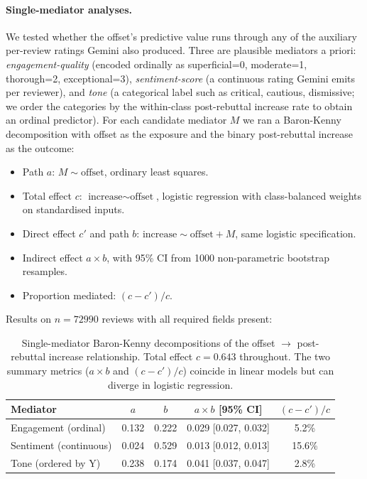 \documentclass{article}
\begin{document}
\paragraph{Single-mediator analyses.}
We tested whether the offset's predictive value runs through any of the auxiliary per-review ratings Gemini also produced. Three are plausible mediators a priori: \emph{engagement-quality} (encoded ordinally as superficial=0, moderate=1, thorough=2, exceptional=3), \emph{sentiment-score} (a continuous rating Gemini emits per reviewer), and \emph{tone} (a categorical label such as critical, cautious, dismissive; we order the categories by the within-class post-rebuttal increase rate to obtain an ordinal predictor). For each candidate mediator $M$ we ran a Baron-Kenny decomposition with offset as the exposure and the binary post-rebuttal increase as the outcome:

\begin{itemize}
    \item Path $a$: $M \sim \text{offset}$, ordinary least squares.
    \item Total effect $c$: $\text{increase} \sim \text{offset}$, logistic regression with class-balanced weights on standardised inputs.
    \item Direct effect $c'$ and path $b$: $\text{increase} \sim \text{offset} + M$, same logistic specification.
    \item Indirect effect $a \times b$, with 95\% CI from \num{1000} non-parametric bootstrap resamples.
    \item Proportion mediated: $(c - c') / c$.
\end{itemize}

Results on $n = \num{72990}$ reviews with all required fields present:

\begin{table}[htbp]
    \centering
    \caption{Single-mediator Baron-Kenny decompositions of the offset $\to$ post-rebuttal increase relationship. Total effect $c = 0.643$ throughout. The two summary metrics ($a \times b$ and $(c - c')/c$) coincide in linear models but can diverge in logistic regression.}
    \label{tab:mediation}
    \begin{tabular}{lcccc}
    \toprule
    Mediator & $a$ & $b$ & $a \times b$ [95\% CI] & $(c - c')/c$ \\
    \midrule
    Engagement (ordinal)  & 0.132 & 0.222 & 0.029 [0.027, 0.032] & 5.2\% \\
    Sentiment (continuous) & 0.024 & 0.529 & 0.013 [0.012, 0.013] & 15.6\% \\
    Tone (ordered by Y)    & 0.238 & 0.174 & 0.041 [0.037, 0.047] & 2.8\% \\
    \bottomrule
    \end{tabular}
\end{table}
\end{document}
